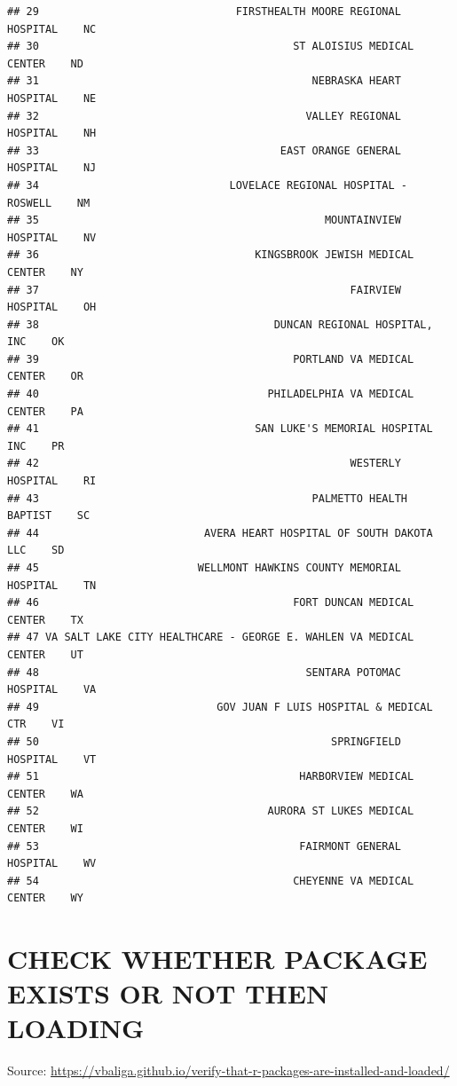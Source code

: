 \documentclass[
]{book}
\theoremstyle{definition}
\theoremstyle{definition}
\theoremstyle{definition}
\theoremstyle{definition}
\theoremstyle{remark}
\begin{document}
\begin{verbatim}
## 29                               FIRSTHEALTH MOORE REGIONAL HOSPITAL    NC
## 30                                        ST ALOISIUS MEDICAL CENTER    ND
## 31                                           NEBRASKA HEART HOSPITAL    NE
## 32                                          VALLEY REGIONAL HOSPITAL    NH
## 33                                      EAST ORANGE GENERAL HOSPITAL    NJ
## 34                              LOVELACE REGIONAL HOSPITAL - ROSWELL    NM
## 35                                             MOUNTAINVIEW HOSPITAL    NV
## 36                                  KINGSBROOK JEWISH MEDICAL CENTER    NY
## 37                                                 FAIRVIEW HOSPITAL    OH
## 38                                     DUNCAN REGIONAL HOSPITAL, INC    OK
## 39                                        PORTLAND VA MEDICAL CENTER    OR
## 40                                    PHILADELPHIA VA MEDICAL CENTER    PA
## 41                                  SAN LUKE'S MEMORIAL HOSPITAL INC    PR
## 42                                                 WESTERLY HOSPITAL    RI
## 43                                           PALMETTO HEALTH BAPTIST    SC
## 44                          AVERA HEART HOSPITAL OF SOUTH DAKOTA LLC    SD
## 45                         WELLMONT HAWKINS COUNTY MEMORIAL HOSPITAL    TN
## 46                                        FORT DUNCAN MEDICAL CENTER    TX
## 47 VA SALT LAKE CITY HEALTHCARE - GEORGE E. WAHLEN VA MEDICAL CENTER    UT
## 48                                          SENTARA POTOMAC HOSPITAL    VA
## 49                            GOV JUAN F LUIS HOSPITAL & MEDICAL CTR    VI
## 50                                              SPRINGFIELD HOSPITAL    VT
## 51                                         HARBORVIEW MEDICAL CENTER    WA
## 52                                    AURORA ST LUKES MEDICAL CENTER    WI
## 53                                         FAIRMONT GENERAL HOSPITAL    WV
## 54                                        CHEYENNE VA MEDICAL CENTER    WY
\end{verbatim}

\hypertarget{check-whether-package-exists-or-not-then-loading}{%
\chapter{CHECK WHETHER PACKAGE EXISTS OR NOT THEN LOADING}\label{check-whether-package-exists-or-not-then-loading}}

Source: \url{https://vbaliga.github.io/verify-that-r-packages-are-installed-and-loaded/}
\end{document}
